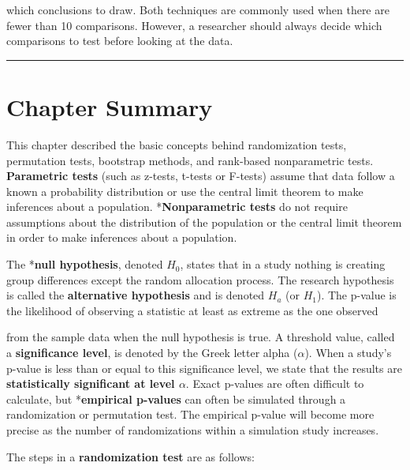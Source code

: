 \documentclass[
]{report}
\theoremstyle{definition}
\theoremstyle{definition}
\theoremstyle{definition}
\theoremstyle{definition}
\theoremstyle{remark}
\begin{document}
which conclusions to draw. Both techniques are commonly used when there are fewer than 10 comparisons. However, a researcher should always decide which comparisons to test before looking at the data.

\begin{center}\rule{0.5\linewidth}{0.5pt}\end{center}

\hypertarget{chapter-summary}{%
\section*{\texorpdfstring{\textbf{Chapter Summary}}{Chapter Summary}}\label{chapter-summary}}

This chapter described the basic concepts behind randomization tests, permutation tests, bootstrap methods, and rank-based nonparametric tests. \textbf{Parametric tests} (such as z-tests, t-tests or F-tests) assume that data follow a known a probability distribution or use the central limit theorem to make inferences about a population. *\textbf{Nonparametric tests} do not require assumptions about the distribution of the population or the central limit theorem in order to make inferences about a population.

The *\textbf{null hypothesis}, denoted \(H_0\), states that in a study nothing is creating group differences except the random allocation process. The research hypothesis is called the \textbf{alternative hypothesis} and is denoted \(H_a\) (or \(H_1\)). The p-value is the likelihood of observing a statistic at least as extreme as the one observed

from the sample data when the null hypothesis is true. A threshold value, called a \textbf{significance level}, is denoted by the Greek letter alpha (\(\alpha\)). When a study's p-value is less than or equal to this significance level, we state that the results are \textbf{statistically significant at level \(\alpha\)}. Exact p-values are often difficult to calculate, but *\textbf{empirical p-values} can often be simulated through a randomization or permutation test. The empirical p-value will become more precise as the number of randomizations within a simulation study
increases.

The steps in a \textbf{randomization test} are as follows:
\end{document}
